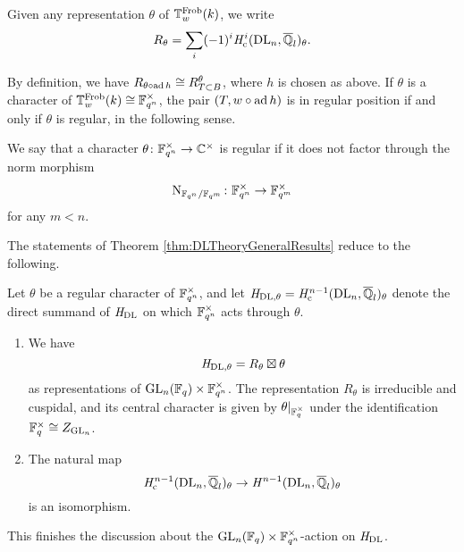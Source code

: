 \documentclass[../main.tex]{subfiles}
\begin{document}
Given any representation $\theta$ of $\mathbb{T}^{\mathrm{Frob}}_w(k)$, we write
\begin{equation*}
  R_\theta = \sum_i (-1)^i \mathit H_{\mathrm{c}}^i(\mathrm{DL}_n, \overline {\mathbb{Q}}_l)_\theta.
\end{equation*}

By definition, we have $R_{\theta \circ \operatorname{ad} h} \cong R^\theta_{T\subset B}$,
where $h$ is chosen as above. If $\theta$ is a
character of $\mathbb{T}_w^{\mathrm{Frob}}(k) \cong \mathbb{F}_{q^n}^\times$, the pair $(T, w \circ \operatorname{ad}
h)$ is in regular position if and only if $\theta$ is regular, in the following
sense.

\begin{defi}\label{def:RegChar}
  We say that a character $\theta\colon  \mathbb{F}_{q^n}^\times \to \mathbb{C}^\times$ is 
  regular if it does not factor through the norm morphism
  $$\operatorname{N}_{\mathbb{F}_{q^n}/\mathbb{F}_{q^m}}\colon \mathbb{F}_{q^n}^\times \to \mathbb{F}_{q^m}^\times$$ 
  for any $m < n$.
\end{defi}


The statements of Theorem \ref{thm:DLTheoryGeneralResults} reduce to
the following.

\begin{thm}\label{thm:DLCorrespondenceForUs}
  Let $\theta$ be a regular character of $\mathbb{F}_{q^n}^\times$, and let
  $\mathit H_{\mathrm{DL},\theta} = \mathit H_{\mathrm{c}}^{n-1}(\mathrm{DL}_n, \overline {\mathbb{Q}}_l)_\theta$ denote the direct
  summand of $\mathit H_\mathrm{DL}$ on which $\mathbb{F}_{q^n}^\times$
  acts through $\theta$. 
  \begin{enumerate}
    \item We have
      \begin{equation*}
        \mathit H_{\mathrm{DL},\theta} = R_\theta \boxtimes
        \theta
      \end{equation*}
      as representations of $\operatorname{GL}_n(\mathbb{F}_q) \times \mathbb{F}_{q^n}^\times$.
      The representation $R_\theta$ is irreducible and cuspidal, and its central
      character is given by $\theta|_{\mathbb{F}_q^\times}$ under the identification
      $\mathbb{F}_q^\times \cong Z_{\operatorname{GL}_n}$.
    \item The natural map 
      \begin{equation*}
        \mathit H_{\mathrm{c}}^{n-1}(\mathrm{DL}_n, \overline {\mathbb{Q}}_l)_\theta \to
        \mathit H^{n-1}(\mathrm{DL}_n, \overline {\mathbb{Q}}_l)_\theta
      \end{equation*}
      is an isomorphism.
  \end{enumerate}
\end{thm}

This finishes the discussion about the $\operatorname{GL}_n(\mathbb{F}_q) \times \mathbb{F}_{q^n}^\times$-action
on $\mathit H_{\mathrm{DL}}$. 
\end{document}
